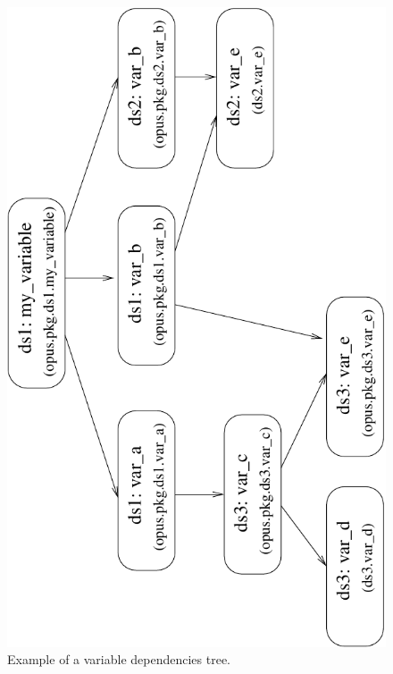 {\begin{figure}
\begin{center}
\includegraphics[scale=0.6, angle=-90]{images/variabletreeinitial.pdf}
\caption{\label{fig:opus-core-variable-tree}\small Example of a variable
  dependencies tree.}

\end{center}
\end{figure}}
